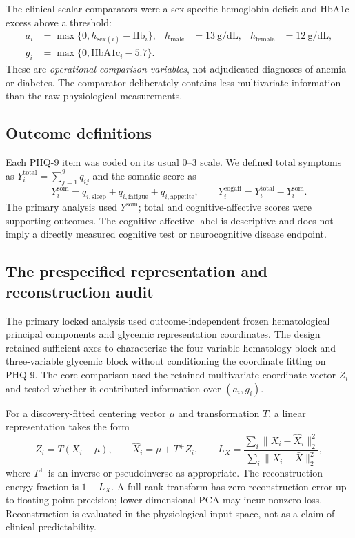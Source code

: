 \documentclass[11pt,a4paper]{article}
\begin{document}
The clinical scalar comparators were a sex-specific hemoglobin deficit and HbA1c excess above a threshold:
\begin{align}
a_i&=\max\{0,h_{\mathrm{sex}(i)}-\mathrm{Hb}_i\}, &h_{\mathrm{male}}&=13\ \mathrm{g/dL}, &h_{\mathrm{female}}&=12\ \mathrm{g/dL},\\
g_i&=\max\{0,\mathrm{HbA1c}_i-5.7\}.
\end{align}
These are \emph{operational comparison variables}, not adjudicated diagnoses of anemia or diabetes. The comparator deliberately contains less multivariate information than the raw physiological measurements.

\subsection{Outcome definitions}
Each PHQ-9 item was coded on its usual 0--3 scale. We defined total symptoms as $Y_i^{\mathrm{total}}=\sum_{j=1}^{9}q_{ij}$ and the somatic score as
\begin{equation}
Y_i^{\mathrm{som}}=q_{i,\mathrm{sleep}}+q_{i,\mathrm{fatigue}}+q_{i,\mathrm{appetite}},\qquad Y_i^{\mathrm{cogaff}}=Y_i^{\mathrm{total}}-Y_i^{\mathrm{som}}.
\end{equation}
The primary analysis used $Y^{\mathrm{som}}$; total and cognitive-affective scores were supporting outcomes. The cognitive-affective label is descriptive and does not imply a directly measured cognitive test or neurocognitive disease endpoint.

\subsection{The prespecified representation and reconstruction audit}
The primary locked analysis used outcome-independent frozen hematological principal components and glycemic representation coordinates. The design retained sufficient axes to characterize the four-variable hematology block and three-variable glycemic block without conditioning the coordinate fitting on PHQ-9. The core comparison used the retained multivariate coordinate vector $Z_i$ and tested whether it contributed information over $(a_i,g_i)$.

For a discovery-fitted centering vector $\mu$ and transformation $T$, a linear representation takes the form
\begin{equation}
Z_i=T(X_i-\mu),\qquad \widehat X_i=\mu+T^{+}Z_i,\qquad
L_{X}=\frac{\sum_i\lVert X_i-\widehat X_i\rVert_2^2}{\sum_i\lVert X_i-\bar X\rVert_2^2},
\label{eq:represent}
\end{equation}
where $T^{+}$ is an inverse or pseudoinverse as appropriate. The reconstruction-energy fraction is $1-L_X$. A full-rank transform has zero reconstruction error up to floating-point precision; lower-dimensional PCA may incur nonzero loss. Reconstruction is evaluated in the physiological input space, not as a claim of clinical predictability.
\end{document}
